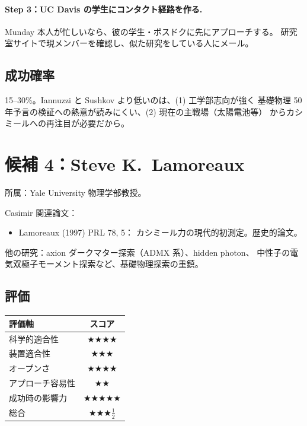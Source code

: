 \documentclass[11pt,a4paper]{article}
\def\textbf#1{#1}%
\begin{document}
\paragraph{Step 3：UC Davis の学生にコンタクト経路を作る.}
Munday 本人が忙しいなら、彼の学生・ポスドクに先にアプローチする。
研究室サイトで現メンバーを確認し、似た研究をしている人にメール。

\subsection{成功確率}

\textbf{15--30\%}。Iannuzzi と Sushkov より低いのは、(1) 工学部志向が強く
基礎物理 50 年予言の検証への熱意が読みにくい、(2) 現在の主戦場（太陽電池等）
からカシミールへの再注目が必要だから。

\newpage

\section{候補 4：Steve K.\ Lamoreaux}

\begin{candidatebox}
\textbf{所属}：Yale University 物理学部教授。

\textbf{Casimir 関連論文}：
\begin{itemize}
\item \textbf{Lamoreaux (1997) PRL 78, 5}：
  カシミール力の現代的初測定。歴史的論文。
\end{itemize}

\textbf{他の研究}：axion ダークマター探索（ADMX 系）、hidden photon、
中性子の電気双極子モーメント探索など、\textbf{基礎物理探索の重鎮}。
\end{candidatebox}

\subsection{評価}

\begin{center}
\begin{tabular}{lc}
\toprule
評価軸 & スコア \\
\midrule
科学的適合性    & ★★★★ \\
装置適合性      & ★★★ \\
オープンさ      & ★★★★ \\
アプローチ容易性 & ★★ \\
成功時の影響力  & ★★★★★ \\
\midrule
\textbf{総合}   & \textbf{★★★$\frac{1}{2}$} \\
\bottomrule
\end{tabular}
\end{center}
\end{document}
